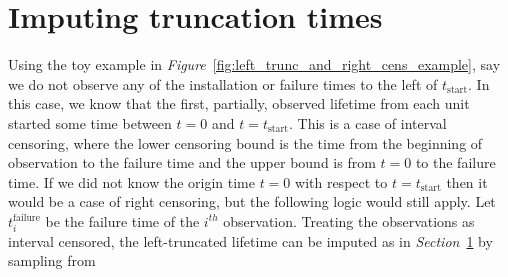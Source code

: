 
\section{Imputing truncation times}

Using the toy example in \textit{Figure}~\ref{fig:left_trunc_and_right_cens_example}, say we do not observe any of the installation or failure times to the left of $t_\text{start}$. In this case, we know that the first, partially, observed lifetime from each unit started some time between $t = 0$ and $t = t_\text{start}$. This is a case of interval censoring, where the lower censoring bound is the time from the beginning of observation to the failure time and the upper bound is from $t = 0$ to the failure time. If we did not know the origin time $t = 0$ with respect to $t = t_\text{start}$ then it would be a case of right censoring, but the following logic would still apply. Let $t^{\text{failure}}_{i}$ be the failure time of the $i^{th}$ observation. Treating the observations as interval censored, the left-truncated lifetime can be imputed as in \textit{Section}~\ref{} by sampling from

